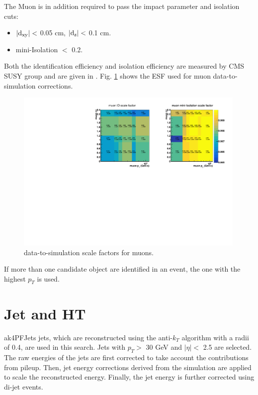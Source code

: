 \documentclass[thesis.tex]{subfiles}
\renewcommand\_{\textunderscore\allowbreak}
\begin{document}
The Muon is in addition required to pass the impact parameter and isolation cuts:
\begin{center}
\begin{itemize}
\item $\mathrm{|d_{xy}|} <$ 0.05 cm, $\mathrm{|d_{z}|} <$ 0.1 cm.
\item mini-Isolation $<$ 0.2.
\end{itemize}
\end{center}

Both the identification efficiency and isolation efficiency are measured by CMS SUSY group and are given in \cite{EGM:leptonScale}. Fig. \ref{fig:muonsf} shows the ESF used for muon data-to-simulation corrections.

\begin{figure}[hbt]
	\centering
	\includegraphics[width=0.99\textwidth]{plot/SF_Muon.pdf}
	\caption{data-to-simulation scale factors for muons.}
	\label{fig:muonsf}
\end{figure}

If more than one candidate object are identified in an event, the one with the highest $p_{T}$ is used.

\section{Jet and HT}
\label{sec:jetID}
ak4PFJets jets, which are reconstructed using the anti-$k_T$ algorithm with a radii of 0.4, are used in this search.
Jets with $p_T >$ 30 GeV and $|\eta| <$ 2.5 are selected. 
The raw energies of the jets are first corrected to take account the contributions from pileup.
Then, jet energy corrections \cite{CMS:JES} derived from the simulation are applied to scale the reconstructed energy.
Finally, the jet energy is further corrected using di-jet events. 
\end{document}

